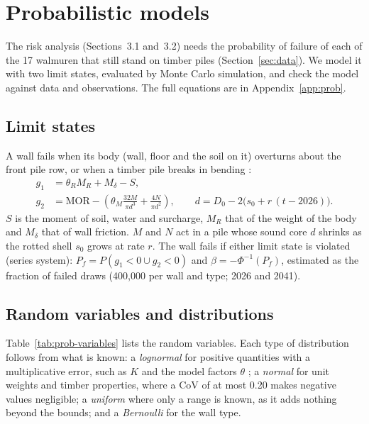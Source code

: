 
\section{Probabilistic models}\label{sec:prob}

The risk analysis (Sections~3.1 and~3.2) needs the probability of failure of
each of the 17 walmuren that still stand on timber piles
(Section~\ref{sec:data}). We model it with two limit states, evaluated by
Monte Carlo simulation, and check the model against data and observations.
The full equations are in Appendix~\ref{app:prob}.

\subsection{Limit states}\label{sec:prob-ls}

A wall fails when its body (wall, floor and the soil on it) overturns about
the front pile row, or when a timber pile breaks in bending
\cite{hemel2023,hemel2024}:
\begin{align}
g_1 &= \theta_R M_R + M_\delta - S, \label{eq:g1}\\
g_2 &= \text{MOR} - \left(\theta_M \frac{32 M}{\pi d^3} + \frac{4N}{\pi d^2}\right),
\qquad d = D_0 - 2\bigl(s_0 + r\,(t - 2026)\bigr). \label{eq:g2}
\end{align}
$S$ is the moment of soil, water and surcharge, $M_R$ that of the weight of
the body and $M_\delta$ that of wall friction. $M$ and $N$ act in a pile whose
sound core $d$ shrinks as the rotted shell $s_0$ grows at rate $r$. The wall
fails if either limit state is violated (series system):
$P_f = P(g_1 < 0 \cup g_2 < 0)$ and $\beta = -\Phi^{-1}(P_f)$, estimated as
the fraction of failed draws (400{,}000 per wall and type; 2026 and 2041).

\subsection{Random variables and distributions}\label{sec:prob-variables}

Table~\ref{tab:prob-variables} lists the random variables. Each type of
distribution follows from what is known: a \emph{lognormal} for positive
quantities with a multiplicative error, such as $K$ and the model factors
$\theta$ \cite{jcss2001}; a \emph{normal} for unit weights and timber
properties, where a CoV of at most 0.20 makes negative values negligible; a
\emph{uniform} where only a range is known, as it adds nothing beyond the
bounds; and a \emph{Bernoulli} for the wall type.


